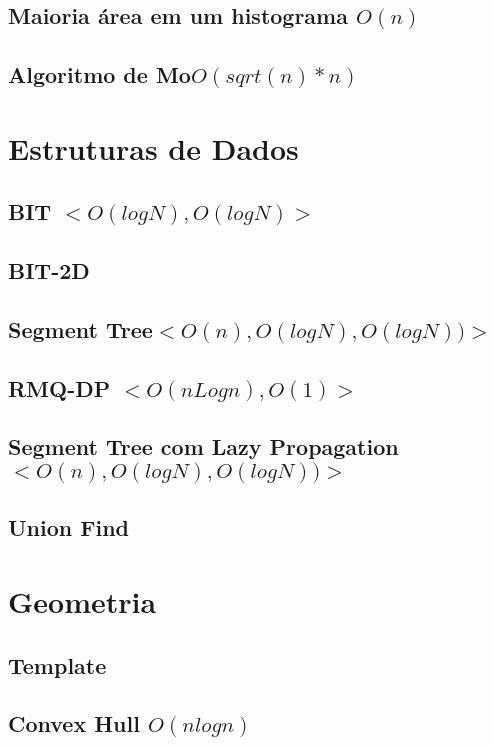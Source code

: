 \documentclass[10pt, letterpaper, twocolumn, twosides]{article}
\begin{document}
\subsection{Maioria área em um histograma ${O(n)}$}

\subsection{Algoritmo de Mo${O(sqrt(n)*n)}$}


\section{Estruturas de Dados}
\subsection{BIT ${<O(logN), O(logN)>}$}

\subsection{BIT-2D}

\subsection{Segment Tree${<O(n), O(logN), O(logN))>}$}

\subsection{RMQ-DP ${<O(nLogn), O(1)>}$}

\subsection{Segment Tree com Lazy Propagation ${<O(n), O(logN), O(logN))>}$}

\subsection{Union Find}


\section{Geometria}
\subsection{Template}

\subsection{Convex Hull ${O(n log n)}$}

\end{document}
